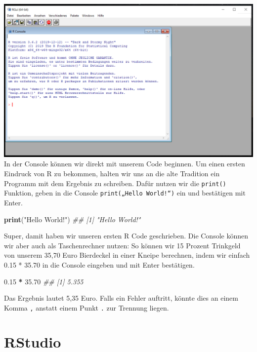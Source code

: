 \documentclass[
]{book}
\newenvironment{Shaded}{\begin{snugshade}}{\end{snugshade}}
\newcommand{\CommentTok}[1]{\textcolor[rgb]{0.56,0.35,0.01}{\textit{#1}}}
\newcommand{\FloatTok}[1]{\textcolor[rgb]{0.00,0.00,0.81}{#1}}
\newcommand{\KeywordTok}[1]{\textcolor[rgb]{0.13,0.29,0.53}{\textbf{#1}}}
\newcommand{\NormalTok}[1]{#1}
\newcommand{\OperatorTok}[1]{\textcolor[rgb]{0.81,0.36,0.00}{\textbf{#1}}}
\newcommand{\StringTok}[1]{\textcolor[rgb]{0.31,0.60,0.02}{#1}}
\begin{document}
\includegraphics[width=21.25in]{img/s_r-console}
In der Console können wir direkt mit unserem Code beginnen. Um einen ersten Eindruck von R zu bekommen, halten wir uns an die alte Tradition ein Programm mit dem Ergebnis zu schreiben. Dafür nutzen wir die \texttt{print()} Funktion, geben in die Console \texttt{print(„Hello\ World!“)} ein und bestätigen mit Enter.

\begin{Shaded}
\begin{Highlighting}[]
\KeywordTok{print}\NormalTok{(}\StringTok{"Hello World!"}\NormalTok{)}
\CommentTok{## [1] "Hello World!"}
\end{Highlighting}
\end{Shaded}

Super, damit haben wir unseren ersten R Code geschrieben.
Die Console können wir aber auch als Taschenrechner nutzen: So können wir 15 Prozent Trinkgeld von unserem 35,70 Euro Bierdeckel in einer Kneipe berechnen, indem wir einfach 0.15 * 35.70 in die Console eingeben und mit Enter bestätigen.

\begin{Shaded}
\begin{Highlighting}[]
\FloatTok{0.15} \OperatorTok{*}\StringTok{ }\FloatTok{35.70}
\CommentTok{## [1] 5.355}
\end{Highlighting}
\end{Shaded}

Das Ergebnis lautet 5,35 Euro. Falls ein Fehler auftritt, könnte dies an einem Komma \texttt{,} anstatt einem Punkt \texttt{.} zur Trennung liegen.

\hypertarget{rstudio}{%
\section{RStudio}\label{rstudio}}
\end{document}
